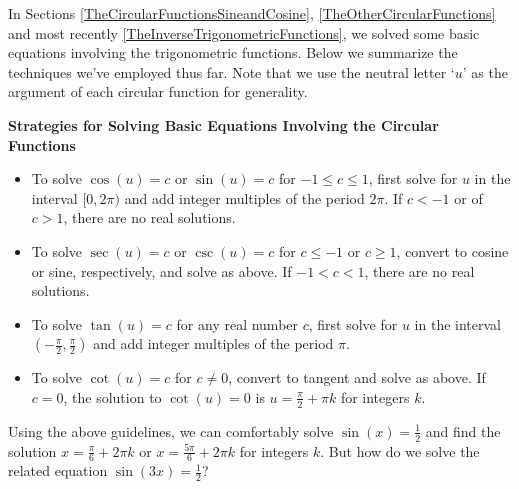 

\setcounter{footnote}{0}

\label{TrigonometricEquationsandInequalities}

In Sections \ref{TheCircularFunctionsSineandCosine}, \ref{TheOtherCircularFunctions} and most recently \ref{TheInverseTrigonometricFunctions}, we solved some basic equations involving the trigonometric functions. Below we summarize the techniques we've employed thus far.  Note that we use the neutral letter `$u$' as the argument of each circular function for generality.

\smallskip

\label{trigeqnstrategy1}

\colorbox{ResultColor}{\bbm
\centerline{\textbf{Strategies for Solving Basic Equations Involving the Circular Functions}}

\smallskip

\begin{itemize}

\item To solve $\cos(u) = c$ or $\sin(u) = c$ for $-1 \leq c \leq 1$, first solve for $u$ in the interval $[0,2\pi)$ and add integer multiples of the period $2\pi$.  If $c < -1$ or of $c > 1$, there are no real solutions.

\item To solve $\sec(u) = c$ or $\csc(u) = c$ for $c \leq -1$ or $c \geq 1$,  convert to cosine or sine, respectively, and solve as above.  If $-1 < c < 1$, there are no real solutions.

\item To solve  $\tan(u) = c$ for any real number $c$,  first solve for $u$ in the interval $\left(-\frac{\pi}{2}, \frac{\pi}{2}\right)$ and add integer multiples of the period $\pi$.

\item  To solve  $\cot(u) = c$ for $c \neq 0$, convert to tangent and solve as above.  If $c = 0$, the solution to $\cot(u) = 0$ is $u = \frac{\pi}{2} + \pi k$ for integers $k$.

\end{itemize}

\smallskip

\ebm}

\smallskip

Using the above guidelines, we can comfortably solve $\sin(x) = \frac{1}{2}$ and find the solution $x = \frac{\pi}{6} + 2\pi k$ or $x = \frac{5\pi}{6} + 2\pi k$ for integers $k$.  But how do we solve the related equation $\sin(3x) = \frac{1}{2}$?

